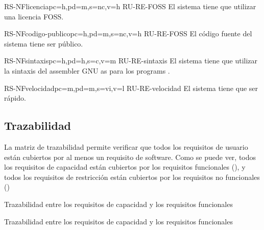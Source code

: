 \begin{softwareReq}{RS-NF}{licencia}{pc=h,pd=m,s=nc,v=h}
    {RU-RE-FOSS}
    El sistema tiene que utilizar una licencia \gls{FOSS}.
\end{softwareReq}

\begin{softwareReq}{RS-NF}{codigo-publico}{pc=h,pd=m,s=nc,v=h}
    {RU-RE-FOSS}
    El código fuente del sistema tiene ser público.
\end{softwareReq}

\begin{softwareReq}{RS-NF}{sintaxis}{pc=h,pd=h,s=c,v=m}
    {RU-RE-sintaxis}
    El sistema tiene que utilizar la sintaxis del \gls{assembler} GNU as para
    los \glspl{program} .
\end{softwareReq}

\begin{softwareReq}{RS-NF}{velocidad}{pc=m,pd=m,s=vi,v=l}
    {RU-RE-velocidad}
    El sistema tiene que ser rápido. %
\end{softwareReq}

\FloatBarrier


\subsection{Trazabilidad}\label{subsec:trazability}

La matriz de trazabilidad permite verificar que todos los requisitos de usuario
están cubiertos por al menos un requisito de software. Como se puede ver, todos
los requisitos de capacidad están cubiertos por los requisitos funcionales
(), y todos los requisitos de restricción están
cubiertos por los requisitos no funcionales ()

    {Trazabilidad entre los requisitos de capacidad y los requisitos funcionales}

    {Trazabilidad entre los requisitos de capacidad y los requisitos funcionales}

\FloatBarrier

